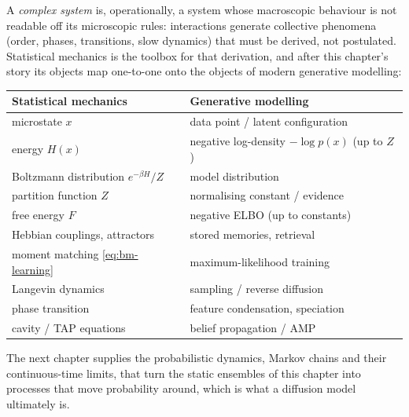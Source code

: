 A \emph{complex system} is, operationally, a system whose macroscopic
behaviour is not readable off its microscopic rules: interactions
generate collective phenomena (order, phases, transitions, slow dynamics)
that must be derived, not postulated. Statistical mechanics is the
toolbox for that derivation, and after this chapter's story its objects
map one-to-one onto the objects of modern generative modelling:
\begin{center}
\begin{tabular}{ll}
\toprule
\textbf{Statistical mechanics} & \textbf{Generative modelling} \\
\midrule
microstate $x$ & data point / latent configuration \\
energy $H(x)$ & negative log-density $-\log p(x)$ (up to $Z$) \\
Boltzmann distribution $e^{-\beta H}/Z$ & model distribution \\
partition function $Z$ & normalising constant / evidence \\
free energy $F$ & negative ELBO (up to constants) \\
Hebbian couplings, attractors & stored memories, retrieval \\
moment matching \eqref{eq:bm-learning} & maximum-likelihood training \\
Langevin dynamics & sampling / reverse diffusion \\
phase transition & feature condensation, speciation \\
cavity / TAP equations & belief propagation / AMP \\
\bottomrule
\end{tabular}
\end{center}
The next chapter supplies the probabilistic dynamics, Markov chains and
their continuous-time limits, that turn the static ensembles of this
chapter into processes that move probability around, which is what a
diffusion model ultimately is.
